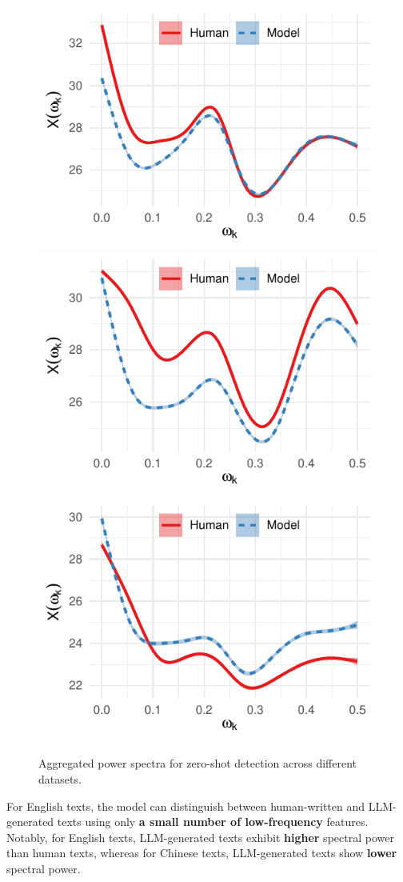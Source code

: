 \documentclass[lettersize,journal]{IEEEtran}
\begin{document}
\begin{figure}[H]
    \includegraphics[width=0.3\linewidth]{images/zh_news_aggregated.pdf}
    \includegraphics[width=0.3\linewidth]{images/zh_webnovel_aggregated.pdf}
    \includegraphics[width=0.3\linewidth]{images/zh_wiki_aggregated.pdf}

    \par\smallskip

    \caption{Aggregated power spectra for zero-shot detection across different datasets.}
\end{figure}


For English texts, the model can distinguish between human-written and LLM-generated texts using only \textbf{a small number of low-frequency} features. Notably, for English texts, LLM-generated texts exhibit \textbf{higher} spectral power than human texts, whereas for Chinese texts, LLM-generated texts show \textbf{lower} spectral power.
\end{document}
